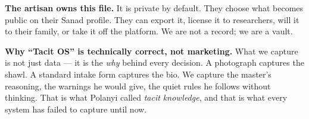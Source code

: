 \documentclass[11pt, a4paper]{article}
\begin{document}
\begin{layerbox}
\textbf{The artisan owns this file.} It is private by default. They choose what becomes public on their Sanad profile. They can export it, license it to researchers, will it to their family, or take it off the platform. We are not a record; we are a vault.

\textbf{Why ``Tacit OS'' is technically correct, not marketing.} What we capture is not just data --- it is the {\itshape why} behind every decision. A photograph captures the shawl. A standard intake form captures the bio. We capture the master's reasoning, the warnings he would give, the quiet rules he follows without thinking. That is what Polanyi called {\itshape tacit knowledge}, and that is what every system has failed to capture until now.
\end{layerbox}

\end{document}
